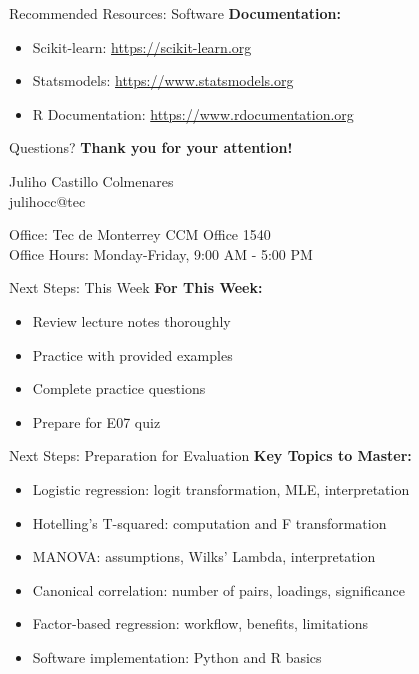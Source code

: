 \documentclass[aspectratio=169,ignorenonframetext]{beamer}
\begin{document}
\begin{frame}{Recommended Resources: Software}
\textbf{Documentation:}

\begin{itemize}
\item
  Scikit-learn: \url{https://scikit-learn.org}
\item
  Statsmodels: \url{https://www.statsmodels.org}
\item
  R Documentation: \url{https://www.rdocumentation.org}
\end{itemize}
\end{frame}

\begin{frame}{Questions?}
\textbf{ Thank you for your attention! }

Juliho Castillo Colmenares\\
julihocc@tec

Office: Tec de Monterrey CCM Office 1540\\
Office Hours: Monday-Friday, 9:00 AM - 5:00 PM
\end{frame}

\begin{frame}{Next Steps: This Week}
\textbf{For This Week:}

\begin{itemize}
\item
  Review lecture notes thoroughly
\item
  Practice with provided examples
\item
  Complete practice questions
\item
  Prepare for E07 quiz
\end{itemize}
\end{frame}

\begin{frame}{Next Steps: Preparation for Evaluation}
\textbf{Key Topics to Master:}

\begin{itemize}
\item
  Logistic regression: logit transformation, MLE, interpretation
\item
  Hotelling's T-squared: computation and F transformation
\item
  MANOVA: assumptions, Wilks' Lambda, interpretation
\item
  Canonical correlation: number of pairs, loadings, significance
\item
  Factor-based regression: workflow, benefits, limitations
\item
  Software implementation: Python and R basics
\end{itemize}
\end{frame}
\end{document}
